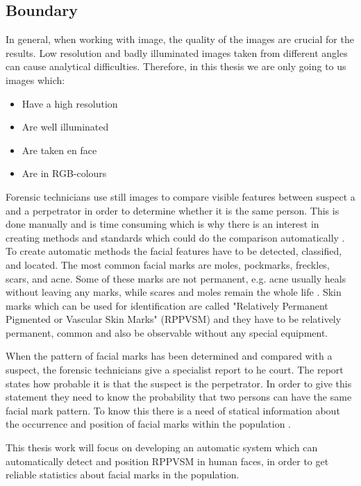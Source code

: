 \subsection{Boundary}

In general, when working with image, the quality of the images are crucial for the results. Low resolution and badly illuminated images taken from different angles can cause analytical difficulties. Therefore, in this thesis we are only going to us images which:

\begin{itemize}
	\item Have a high resolution
	\item Are well illuminated
	\item Are taken en face
	\item Are in RGB-colours 
\end{itemize}










Forensic technicians use still images to compare visible features between suspect a and a perpetrator in order to determine whether it is the same person. This is done manually and is time consuming which is why there is an interest in creating methods and standards which could do the comparison automatically \cite{forensic_identification}. To create automatic methods the facial features have to be detected, classified, and located. The most common facial marks are moles, pockmarks, freckles, scars, and acne. Some of these marks are not permanent, e.g. acne usually heals without leaving any marks, while scares and moles remain the whole life    \cite{automatic_detector_2015}. Skin marks which can be used for identification are called "Relatively Permanent Pigmented or Vascular Skin Marks" (RPPVSM) and they have to be relatively permanent, common and also be observable without any special equipment. \cite{statistic_RPPVSM}

When the pattern of facial marks has been determined and compared with a suspect, the forensic technicians give a specialist report to he court. The report states how probable it is that the suspect is the perpetrator. In order to give this statement they need to know the probability that two persons can have the same facial mark pattern. To know this there is a need of statical information about the occurrence and position of facial marks within the population \cite{NFC_stat}.

This thesis work will focus on developing an automatic system which can automatically detect and position RPPVSM in human faces, in order to get reliable statistics about facial marks in the population.   